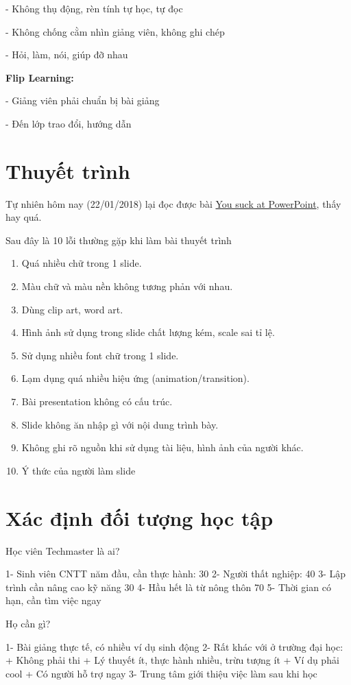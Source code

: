 - Không thụ động, rèn tính tự học, tự đọc

- Không chống cằm nhìn giảng viên, không ghi chép

- Hỏi, làm, nói, giúp đỡ nhau

\textbf{Flip Learning:}

- Giảng viên phải chuẩn bị bài giảng

- Đến lớp trao đổi, hướng dẫn

\section{Thuyết trình}

Tự nhiên hôm nay (22/01/2018) lại đọc được bài \href{https://huynq.net/you-suck-at-powerpoint/}{You suck at PowerPoint}, thấy hay quá.

Sau đây là 10 lỗi thường gặp khi làm bài thuyết trình

\begin{enumerate}
  \item Quá nhiều chữ trong 1 slide.
  \item Màu chữ và màu nền không tương phản với nhau.
  \item Dùng clip art, word art.
  \item Hình ảnh sử dụng trong slide chất lượng kém, scale sai tỉ lệ.
  \item Sử dụng nhiều font chữ trong 1 slide.
  \item Lạm dụng quá nhiều hiệu ứng (animation/transition).
  \item Bài presentation không có cấu trúc.
  \item Slide không ăn nhập gì với nội dung trình bày.
  \item Không ghi rõ nguồn khi sử dụng tài liệu, hình ảnh của người khác.
  \item Ý thức của người làm slide
\end{enumerate}

\section{Xác định đối tượng học tập}

Học viên Techmaster là ai?

1- Sinh viên CNTT năm đầu, cần thực hành: 30%
2- Người thất nghiệp: 40%
3- Lập trình cần nâng cao kỹ năng 30%
4- Hầu hết là từ nông thôn 70%
5- Thời gian có hạn, cần tìm việc ngay

Họ cần gì?

1- Bài giảng thực tế, có nhiều ví dụ sinh động
2- Rất khác với ở trường đại học:
+ Không phải thi
+ Lý thuyết ít, thực hành nhiều, trừu tượng ít
+ Ví dụ phải cool
+ Có người hỗ trợ ngay
3- Trung tâm giới thiệu việc làm sau khi học

